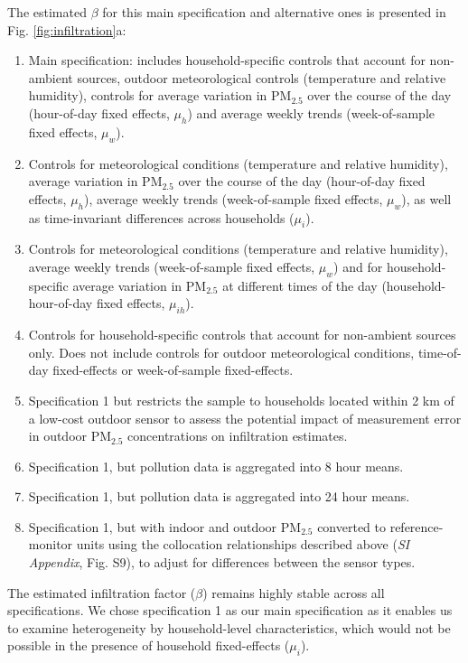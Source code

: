 \documentclass[9pt,twocolumn,twoside]{pnas-new}
\providecommand{\DIFadd}[1]{{\protect\color{red}#1}}
\begin{document}
The estimated $\beta$ for this main specification and alternative ones is presented in Fig. \ref{fig:infiltration}a: 
\begin{enumerate}
    \item Main specification: includes household-specific controls that account for non-ambient sources, \DIFadd{outdoor meteorological controls (temperature and relative humidity),} controls for average variation in PM$_{2.5}$ over the course of the day (hour-of-day fixed effects, $\mu_h$) and average weekly trends (week-of-sample fixed effects, $\mu_w$).
    \item Controls for \DIFadd{meteorological conditions (temperature and relative humidity),} average variation in PM$_{2.5}$ over the course of the day (hour-of-day fixed effects, $\mu_h$),  average weekly trends (week-of-sample fixed effects, $\mu_w$), as well as time-invariant differences across households ($\mu_i$).
    \item Controls for \DIFadd{meteorological conditions (temperature and relative humidity),} average weekly trends (week-of-sample fixed effects, $\mu_w$) and for household-specific average variation in PM$_{2.5}$ at different times of the day (household-hour-of-day fixed effects, $\mu_{ih}$).
    \item \DIFadd{Controls for household-specific controls that account for non-ambient sources only. Does not include controls for outdoor meteorological conditions, time-of-day fixed-effects or week-of-sample fixed-effects.}
    \item Specification 1 but restricts the sample to households located within 2 km of a low-cost outdoor sensor to assess the potential impact of measurement error in outdoor PM$_{2.5}$ concentrations on infiltration estimates.
    \item Specification 1, but pollution data is aggregated into 8 hour means. 
    \item Specification 1, but pollution data is aggregated into 24 hour means.
    \item \DIFadd{Specification 1, but with indoor and outdoor PM$_{2.5}$ converted to reference-monitor units using the collocation relationships described above (}\textit{\DIFadd{SI Appendix}}\DIFadd{, Fig. S9), to adjust for differences between the sensor types.}
\end{enumerate}

The estimated infiltration factor ($\beta$) remains highly stable across all specifications. We chose specification 1 as our main specification as it enables us to examine heterogeneity by household-level characteristics, which would not be possible in the presence of household fixed-effects ($\mu_i$). 
\\ 
\end{document}
